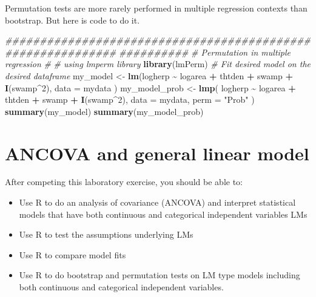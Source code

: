 \documentclass[
  12pt,
]{book}
\newenvironment{Shaded}{\begin{snugshade}}{\end{snugshade}}
\newcommand{\CommentTok}[1]{\textcolor[rgb]{0.56,0.35,0.01}{\textit{#1}}}
\newcommand{\DataTypeTok}[1]{\textcolor[rgb]{0.13,0.29,0.53}{#1}}
\newcommand{\DecValTok}[1]{\textcolor[rgb]{0.00,0.00,0.81}{#1}}
\newcommand{\KeywordTok}[1]{\textcolor[rgb]{0.13,0.29,0.53}{\textbf{#1}}}
\newcommand{\NormalTok}[1]{#1}
\newcommand{\OperatorTok}[1]{\textcolor[rgb]{0.81,0.36,0.00}{\textbf{#1}}}
\newcommand{\StringTok}[1]{\textcolor[rgb]{0.31,0.60,0.02}{#1}}
\providecommand{\tightlist}{%
  \setlength{\itemsep}{0pt}\setlength{\parskip}{0pt}}
\begin{document}
Permutation tests are more rarely performed in multiple regression contexts than bootstrap. But here is code to do it.

\begin{Shaded}
\begin{Highlighting}[]
\CommentTok{\#\#\#\#\#\#\#\#\#\#\#\#\#\#\#\#\#\#\#\#\#\#\#\#\#\#\#\#\#\#\#\#\#\#\#\#\#\#\#\#\#\#\#\#\#\#\#\#\#\#\#\#\#\#\#\#\#\#\#\#}
\CommentTok{\#\#\#\#\#\#\#\#\#\#}
\CommentTok{\# Permutation in multiple regression}
\CommentTok{\#}
\CommentTok{\# using lmperm library}
\KeywordTok{library}\NormalTok{(lmPerm)}
\CommentTok{\# Fit desired model on the desired dataframe}
\NormalTok{my\_model \textless{}{-}}\StringTok{ }\KeywordTok{lm}\NormalTok{(logherp }\OperatorTok{\textasciitilde{}}\StringTok{ }\NormalTok{logarea }\OperatorTok{+}\StringTok{ }\NormalTok{thtden }\OperatorTok{+}\StringTok{ }\NormalTok{swamp }\OperatorTok{+}\StringTok{ }\KeywordTok{I}\NormalTok{(swamp}\OperatorTok{\^{}}\DecValTok{2}\NormalTok{),}
  \DataTypeTok{data =}\NormalTok{ mydata}
\NormalTok{)}
\NormalTok{my\_model\_prob \textless{}{-}}\StringTok{ }\KeywordTok{lmp}\NormalTok{(}
\NormalTok{  logherp }\OperatorTok{\textasciitilde{}}\StringTok{ }\NormalTok{logarea }\OperatorTok{+}\StringTok{ }\NormalTok{thtden }\OperatorTok{+}\StringTok{ }\NormalTok{swamp }\OperatorTok{+}\StringTok{ }\KeywordTok{I}\NormalTok{(swamp}\OperatorTok{\^{}}\DecValTok{2}\NormalTok{),}
  \DataTypeTok{data =}\NormalTok{ mydata, }\DataTypeTok{perm =} \StringTok{"Prob"}
\NormalTok{)}
\KeywordTok{summary}\NormalTok{(my\_model)}
\KeywordTok{summary}\NormalTok{(my\_model\_prob)}
\end{Highlighting}
\end{Shaded}

\hypertarget{ancova-and-general-linear-model}{%
\chapter{ANCOVA and general linear model}\label{ancova-and-general-linear-model}}

After competing this laboratory exercise, you should be able to:

\begin{itemize}
\tightlist
\item
  Use R to do an analysis of covariance (ANCOVA) and interpret statistical models that have both continuous and categorical
  independent variables LMs
\item
  Use R to test the assumptions underlying LMs
\item
  Use R to compare model fits
\item
  Use R to do bootstrap and permutation tests on LM type models including both continuous and categorical independent variables.
\end{itemize}
\end{document}
